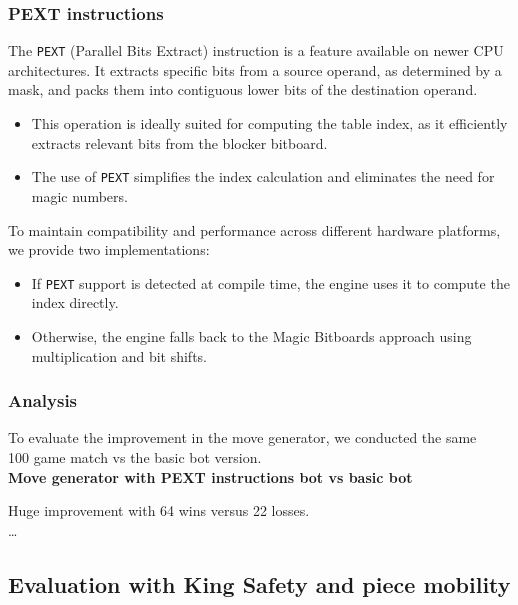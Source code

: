 \subsubsection{PEXT instructions}

The \texttt{PEXT} (Parallel Bits Extract) instruction is a feature available on newer CPU architectures. It extracts specific bits from a source operand, as determined by a mask, and packs them into contiguous lower bits of the destination operand.

\begin{itemize}
  \item This operation is ideally suited for computing the table index, as it efficiently extracts relevant bits from the blocker bitboard.
  \item The use of \texttt{PEXT} simplifies the index calculation and eliminates the need for magic numbers.
\end{itemize}

To maintain compatibility and performance across different hardware platforms, we provide two implementations:
\begin{itemize}
  \item If \texttt{PEXT} support is detected at compile time, the engine uses it to compute the index directly.
  \item Otherwise, the engine falls back to the Magic Bitboards approach using multiplication and bit shifts.
\end{itemize}

\subsubsection{Analysis}

To evaluate the improvement in the move generator, we conducted the same\\
100 game match vs the basic bot version.\\ 

\textbf{Move generator with PEXT instructions bot vs basic bot}\\
\medskip

Huge improvement with 64 wins versus 22 losses.\\

\ldots

\subsection{Evaluation with King Safety and piece mobility}

